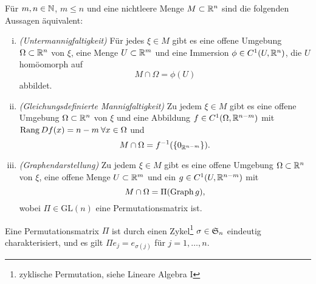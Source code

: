 \documentclass[skript.tex]{subfiles}
\begin{document}
	\begin{theorem}
		Für $m,n\in\mathbb{N}$, $m\le n$ und eine nichtleere Menge $M \subset \mathbb{R}^n$
		sind die folgenden Aussagen äquivalent:
		\begin{enumerate}[(i)]
			\item \emph{(Untermannigfaltigkeit)}\quad
			Für jedes $\xi \in M$ gibt es eine offene Umgebung $\Omega  \subset \mathbb{R}^n$
			von $\xi$, eine Menge $U \subset\mathbb{R}^{m}$ und eine Immersion $ \phi\in C^1(U,\mathbb{R}^n)$,
			die $U$ homöomorph auf
			\[
				M\cap\Omega =  \phi(U)
			\]
			abbildet.
			
			\item \begin{minipage}[t]{.55\textwidth}
				\emph{(Gleichungsdefinierte Mannigfaltigkeit)}\quad
				Zu jedem ${\xi \in M}$ gibt es eine offene Umgebung $\Omega \subset \mathbb{R}^n$ von $\xi$ und eine Abbildung $f \in C^1(\Omega,\mathbb{R}^{n-m})$ mit
				$ \operatorname{\operatorname{Rang}} D f(x)=n-m \:\forall x\in\Omega$ und
				\[
					M \cap \Omega = f^{-1}(\{0_{\mathbb{R}^{n-m}}\}).
				\]
			\end{minipage}
			\hfill
			\begin{minipage}[t][.2\textwidth][b]{.3\textwidth}
			\end{minipage}
			
			\item \emph{(Graphendarstellung)}\quad
			Zu jedem $\xi \in M$ gibt es eine offene Umgebung $\Omega \subset \mathbb{R}^n$ von $\xi$,
			eine offene Menge $U \subset\mathbb{R}^{m}$ und ein $g \in C^1(U,\mathbb{R}^{n-m})$ mit
			\[
				M\cap\Omega = \Pi(\operatorname{Graph} g),
			\]
			wobei $\Pi \in \mathrm{GL}(n)$ eine Permutationsmatrix ist.
		\end{enumerate}
	\end{theorem}
	Eine Permutationsmatrix $\Pi$ ist durch einen Zykel\footnote{zyklische Permutation, siehe Lineare Algebra I} $\sigma\in\mathfrak{S}_{n}$
	eindeutig charakterisiert, und es gilt
	$\Pi e_{j}=e_{\sigma(j)}$ für $j=1,\dotsc, n$.
\end{document}

